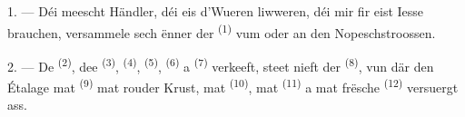 %
%
%
%
%

\VUsaut{4.0mm}
\VUsaut{3.0mm}

\VUsaut{3.0mm}

1. --- Déi meescht Händler, déi eis d'Wueren liwweren, déi mir fir eist Iesse
brauchen, versammele sech ënner der  \textsuperscript{(1)} vum
 oder an den Nopeschstroossen.

2. --- De  \textsuperscript{(2)}, dee 
\textsuperscript{(3)},  \textsuperscript{(4)}, 
\textsuperscript{(5)},  \textsuperscript{(6)} a
 \textsuperscript{(7)} verkeeft, steet nieft der  \textsuperscript{(8)}, vun där den Étalage mat 
\textsuperscript{(9)} mat rouder Krust, mat 
\textsuperscript{(10)}, mat  \textsuperscript{(11)} a mat
frësche  \textsuperscript{(12)} versuergt ass.

